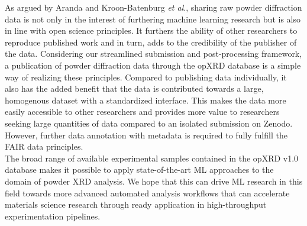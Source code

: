 As argued by Aranda and Kroon-Batenburg \textit{et al}.\cite{Aranda2018, Kroon-Batenburg2024}, sharing raw powder diffraction data is not only in the interest of furthering machine learning research but is also in line with open science principles. It furthers the ability of other researchers to reproduce published work and in turn, adds to the credibility of the publisher of the data. Considering our streamlined submission and post-processing framework, a publication of powder diffraction data through the opXRD database is a simple way of realizing these principles. Compared to publishing data individually, it also has the added benefit that the data is contributed towards a large, homogenous dataset with a standardized interface. This makes the data more easily accessible to other researchers and provides more value to researchers seeking large quantities of data compared to an isolated submission on Zenodo. However, further data annotation with metadata is required to fully fulfill the FAIR data principles.\\

The broad range of available experimental samples contained in the opXRD v1.0 database makes it possible to apply state-of-the-art ML approaches to the domain of powder XRD analysis. We hope that this can drive ML research in this field towards more advanced automated analysis workflows that can accelerate materials science research through ready application in high-throughput experimentation pipelines.\\
